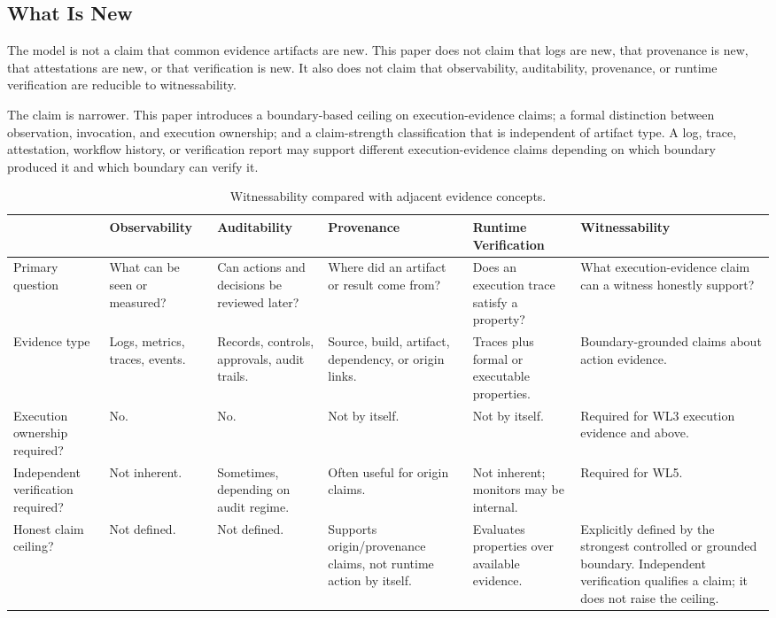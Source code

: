 \documentclass[11pt]{article}
\begin{document}
\subsection{What Is New}

The model is not a claim that common evidence artifacts are new. This paper does not claim that logs are new, that provenance is new, that attestations are new, or that verification is new. It also does not claim that observability, auditability, provenance, or runtime verification are reducible to witnessability.

The claim is narrower. This paper introduces a boundary-based ceiling on execution-evidence claims; a formal distinction between observation, invocation, and execution ownership; and a claim-strength classification that is independent of artifact type. A log, trace, attestation, workflow history, or verification report may support different execution-evidence claims depending on which boundary produced it and which boundary can verify it.

\begin{table}[h]
\centering
\scriptsize
\setlength{\tabcolsep}{3pt}
\renewcommand{\arraystretch}{1.12}
\begin{tabularx}{\textwidth}{@{}P{0.16\textwidth}YYYYY@{}}
\toprule
 & Observability & Auditability & Provenance & Runtime Verification & Witnessability \\
\midrule
Primary question & What can be seen or measured? & Can actions and decisions be reviewed later? & Where did an artifact or result come from? & Does an execution trace satisfy a property? & What execution-evidence claim can a witness honestly support? \\
Evidence type & Logs, metrics, traces, events. & Records, controls, approvals, audit trails. & Source, build, artifact, dependency, or origin links. & Traces plus formal or executable properties. & Boundary-grounded claims about action evidence. \\
Execution ownership required? & No. & No. & Not by itself. & Not by itself. & Required for WL3 execution evidence and above. \\
Independent verification required? & Not inherent. & Sometimes, depending on audit regime. & Often useful for origin claims. & Not inherent; monitors may be internal. & Required for WL5. \\
Honest claim ceiling? & Not defined. & Not defined. & Supports origin/provenance claims, not runtime action by itself. & Evaluates properties over available evidence. & Explicitly defined by the strongest controlled or grounded boundary. Independent verification qualifies a claim; it does not raise the ceiling. \\
\bottomrule
\end{tabularx}
\caption{Witnessability compared with adjacent evidence concepts.}
\end{table}
\end{document}
